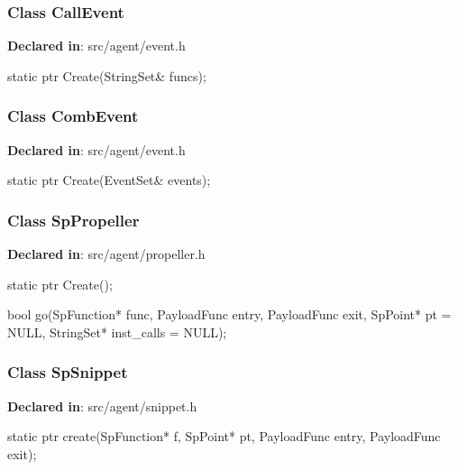 \subsubsection{Class CallEvent}
\textbf{Declared in}: src/agent/event.h

\begin{apient}
static ptr Create(StringSet& funcs);
\end{apient}

\subsubsection{Class CombEvent}
\textbf{Declared in}: src/agent/event.h

\begin{apient}
static ptr Create(EventSet& events);
\end{apient}

\subsubsection{Class SpPropeller}
\textbf{Declared in}: src/agent/propeller.h

\begin{apient}
static ptr Create();
\end{apient}

\begin{apient}
bool go(SpFunction* func,
        PayloadFunc entry,
        PayloadFunc exit,
        SpPoint* pt = NULL,
        StringSet* inst_calls = NULL);
\end{apient}
\apidesc{
}

\subsubsection{Class SpSnippet}
\textbf{Declared in}: src/agent/snippet.h

\begin{apient}
static ptr create(SpFunction* f,
                  SpPoint* pt,
                  PayloadFunc entry,
                  PayloadFunc exit);
\end{apient}
\apidesc{
}

